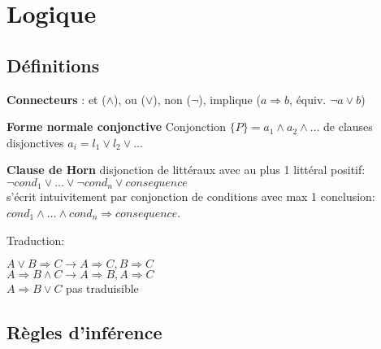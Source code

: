 \section*{Logique}

\subsection*{Définitions}







\textbf{Connecteurs} : et ($\land$), ou ($\lor$), non ($\lnot$), implique ($a \Rightarrow b$, équiv. $\lnot a \lor b$)




\textbf{Forme normale conjonctive}
Conjonction $\{P\} = a_1 \land a_2 \land \dots$ de clauses disjonctives $a_i = l_1 \lor l_2 \lor \dots$

\textbf{Clause de Horn} disjonction de littéraux avec au plus 1 littéral positif:\\
$\lnot cond_1 \lor \dots \lor \lnot cond_n \lor consequence$\\
s'écrit intuivitement par conjonction de conditions avec max 1 conclusion:\\
$cond_1 \land \dots \land cond_n \Rightarrow consequence$. 

Traduction:

$A\lor B \Rightarrow C \rightarrow A \Rightarrow C, B \Rightarrow C$ \\
$A \Rightarrow B \land C \rightarrow A \Rightarrow B, A \Rightarrow C$ \\
$A \Rightarrow B \lor C$ pas traduisible

\subsection*{Règles d'inférence}

